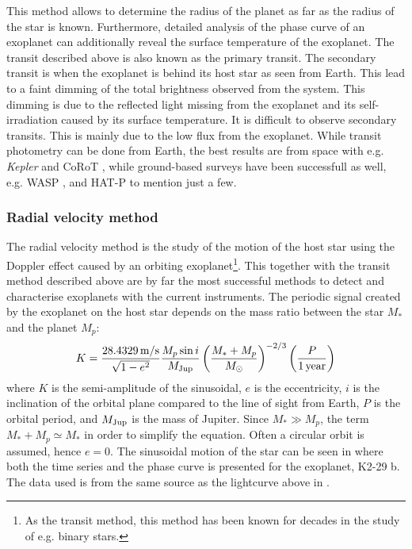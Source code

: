 This method allows to determine the radius of the planet as far as the radius of the star is known.
Furthermore, detailed analysis of the phase curve of an exoplanet can additionally reveal the
surface temperature of the exoplanet. The transit described above is also known as the primary
transit. The secondary transit is when the exoplanet is behind its host star as seen from Earth.
This lead to a faint dimming of the total brightness observed from the system. This dimming is due
to the reflected light missing from the exoplanet and its self-irradiation caused by its surface
temperature. It is difficult to observe secondary transits. This is mainly due to the low flux from
the exoplanet. While transit photometry can be done from Earth, the best results are from space with
e.g. \emph{Kepler} \citep{Borucki2010} and CoRoT \citep{Baglin2006}, while ground-based surveys have
been successfull as well, e.g. WASP \citep{Pollacco2006}, and HAT-P \citep{Bakos2004} to mention
just a few.



\subsubsection{Radial velocity method}
\label{sec:rvmethod}

The radial velocity method is the study of the motion of the host star using the Doppler effect
caused by an orbiting exoplanet\footnote{As the transit method, this method has been known for
decades in the study of e.g. binary stars.}. This together with the transit method described above
are by far the most successful methods to detect and characterise exoplanets  with the current
instruments. The periodic signal created by the exoplanet on the host star depends on the mass ratio
between the star $M_\ast$ and the planet $M_p$:
\begin{align}
  K = \frac{\SI{28.4329}{m/s}}{\sqrt{1-e^2}} \frac{M_p\sin i}{M_\mathrm{Jup}} \left( \frac{M_\ast+M_p}{M_\odot} \right)^{-2/3} \left(\frac{P}{\SI{1}{year}}\right)  \label{eq:rv}
\end{align}
where $K$ is the semi-amplitude of the sinusoidal, $e$ is the eccentricity, $i$ is the inclination
of the orbital plane compared to the line of sight from Earth, $P$ is the orbital period, and
$M_\mathrm{Jup}$ is the mass of Jupiter. Since $M_\ast \gg M_p$, the term $M_\ast+M_p\simeq M_\ast$ in order
to simplify the equation. Often a circular orbit is assumed, hence $e=0$. The sinusoidal motion of
the star can be seen in  where both the time series and the phase curve is
presented for the exoplanet, K2-29 b. The data used is from the same source as the lightcurve above
in .

